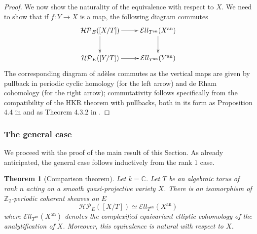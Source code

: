 \documentclass[11pt,letterpaper]{amsart}
\newtheorem{theorem}[dummy]{Theorem}
\newcommand{\bC}{\mathbb{C}}
\newcommand{\bZ}{\mathbb{Z}}
\newcommand{\cHP}{\mathcal{HP}}
\newcommand{\El}{\mathcal{E}ll}
\newcommand{\an}{\mathrm{an}}
\begin{document}
\begin{proof}
We now show the naturality of the equivalence with respect to $X$. We need to show that if $f: Y\to X$ is a map, the following diagram commutes
$$\xymatrix{
\cHP_E([X/T])\ar[r]\ar[d] & \El_{T^{\an}}(X^{\an})\ar[d] \\
\cHP_E([Y/T])\ar[r] & \El_{T^{\an}}(Y^{\an})
}
$$
The corresponding diagram of ad\`eles commutes as the vertical maps are given by pullback in periodic cyclic homology (for the left arrow) and de Rham cohomology (for the right arrow); commutativity follows specifically from the compatibility of the HKR theorem with pullbacks, both in its form as Proposition 4.4 in \cite{BZNLoopConn} and as Theorem 4.3.2 in \cite{HChen}.
\end{proof}

\subsubsection{The general case}

We proceed with the proof of the main result of this Section. As already anticipated, the general case follows inductively from the rank 1 case.

\begin{theorem}[Comparison theorem]\label{theorem:comparisongeneral}
Let $k=\bC$. Let $T$ be an algebraic torus of rank $n$ acting on a smooth quasi-projective variety $X$.
There is an isomorphism of $\bZ_2$-periodic coherent sheaves on $E$
$$\cHP_E([X/T])\simeq\El_{T^{\an}}(X^{\an})$$
where $\El_{T^{\an}}(X^{\an})$ denotes the complexified equivariant elliptic cohomology   of the analytification of $X$. Moreover, this equivalence is natural with respect to $X$.
\end{theorem}
\end{document}

